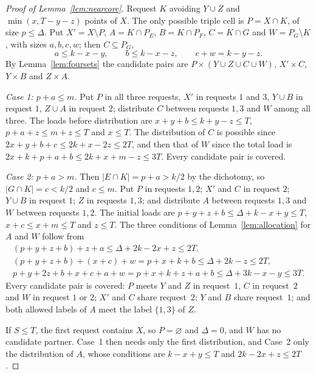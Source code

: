 \documentclass[11pt]{article}
\numberwithin{equation}{section}
\theoremstyle{definition}
\theoremstyle{remark}
\begin{document}
\begin{proof}[Proof of Lemma~\ref{lem:nearcore}]
Request $K$ avoiding $Y\cup Z$ and $\min(x,T-y-z)$ points of $X$. The only
possible triple cell is $P=X\cap K$, of size $p\le\Delta$. Put
$X'=X\setminus P$, $A=K\cap P_E$, $B=K\cap P_F$, $C=K\cap G$ and
$W=P_G\setminus K$, with sizes $a,b,c,w$; then $C\subseteq P_G$,
\[
 a\le k-x-y,\qquad b\le k-x-z,\qquad c+w=k-y-z .
\]
By Lemma~\ref{lem:foursets} the candidate pairs are
$P\times(Y\cup Z\cup C\cup W)$, $X'\times C$, $Y\times B$ and $Z\times A$.

\emph{Case 1: $p+a\le m$.} Put $P$ in all three requests, $X'$ in
requests $1$ and $3$, $Y\cup B$ in request $1$, $Z\cup A$ in request $2$;
distribute $C$ between requests $1,3$ and $W$ among all three. The loads
before distribution are $x+y+b\le k+y-z\le T$, $p+a+z\le m+z\le T$ and
$x\le T$. The distribution of $C$ is possible since
$2x+y+b+c\le2k+x-2z\le2T$, and then that of $W$ since the total load is
$2x+k+p+a+b\le2k+x+m-z\le3T$. Every candidate pair is covered.

\emph{Case 2: $p+a>m$.} Then $|E\cap K|=p+a>k/2$ by the dichotomy, so
$|G\cap K|=c<k/2$ and $c\le m$. Put $P$ in requests $1,2$; $X'$ and $C$ in
request $2$; $Y\cup B$ in request $1$; $Z$ in requests $1,3$; and
distribute $A$ between requests $1,3$ and $W$ between requests $1,2$. The
initial loads are $p+y+z+b\le\Delta+k-x+y\le T$, $x+c\le x+m\le T$ and
$z\le T$. The three conditions of Lemma~\ref{lem:allocation} for $A$ and
$W$ follow from
\begin{gather*}
 (p+y+z+b)+z+a\le\Delta+2k-2x+z\le2T,\\
 (p+y+z+b)+(x+c)+w=p+x+k+b\le\Delta+2k-z\le2T,\\
 p+y+2z+b+x+c+a+w=p+x+k+z+a+b\le\Delta+3k-x-y\le3T .
\end{gather*}
Every candidate pair is covered: $P$ meets $Y$ and $Z$ in request~$1$,
$C$ in request~$2$ and $W$ in request $1$ or $2$; $X'$ and $C$ share
request~$2$; $Y$ and $B$ share request~$1$; and both allowed labels of
$A$ meet the label $\{1,3\}$ of $Z$.

If $S\le T$, the first request contains $X$, so $P=\varnothing$ and
$\Delta=0$, and $W$ has no candidate partner. Case~1 then needs only the
first distribution, and Case~2 only the distribution of $A$, whose
conditions are $k-x+y\le T$ and $2k-2x+z\le2T$.
\end{proof}
\end{document}
